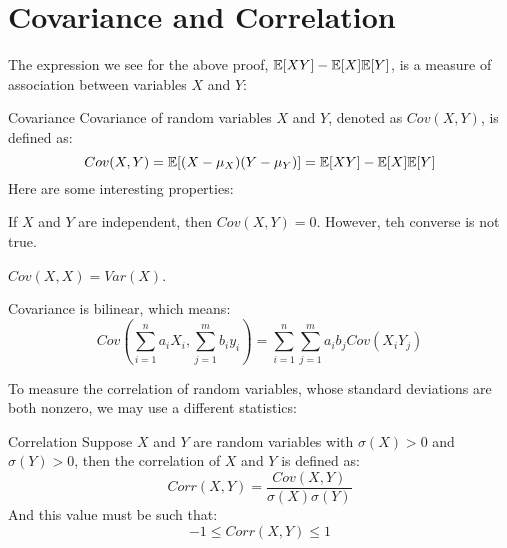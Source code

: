 \section{Covariance and Correlation}
The expression we see for the above proof, $\mathbb{E}[XY] - \mathbb{E}[X]\mathbb{E}[Y]$, is a measure of association between variables $X$ and $Y$:
\begin{ln-define}{Covariance}{}
    Covariance of random variables $X$ and $Y$, denoted as $Cov(X, Y)$, is defined as:
    \[Cov(X, Y) = \mathbb{E}[(X - \mu_X)(Y - \mu_Y)] = \mathbb{E}[XY] - \mathbb{E}[X]\mathbb{E}[Y]\]
    Here are some interesting properties:
    \begin{bindenum}
        \item If $X$ and $Y$ are independent, then $Cov(X, Y) = 0$. However, teh converse is not true.
        \item $Cov(X, X) = Var(X)$.
        \item Covariance is bilinear, which means: \[Cov(\sum_{i = 1}^n a_i X_i, \sum_{j = 1}^m b_i y_i) = \sum_{i = 1}^n \sum_{j = 1}^m a_i b_j Cov(X_i Y_j)\]
    \end{bindenum}
\end{ln-define}
To measure the correlation of random variables, whose standard deviations are both nonzero, we may use a different statistics:
\begin{ln-define}{Correlation}{}
    Suppose $X$ and $Y$ are random variables with $\sigma(X) > 0$ and $\sigma(Y) > 0$, then the correlation of $X$ and $Y$ is defined as:
    \[Corr(X, Y) = \frac{Cov(X, Y)}{\sigma(X) \sigma(Y)}\]
    And this value must be such that:
    \[-1 \leq Corr(X, Y) \leq 1\]
\end{ln-define}

